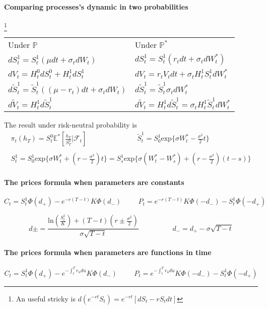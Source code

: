 \documentclass[a4paper,10pt]{article}
\begin{document}
\paragraph{Comparing processes's dynamic in two probabilities} \footnote{An useful stricky is $d(e^{-rt}S_t) = e^{-rt}[dS_t - rS_tdt ]$}
\begin{center}
\begin{tabular}{l|l}
 Under $\mathbb{P}$ & Under $\mathbb{P}^*$                                                      \\[6pt]
 $ dS^1_t = S^1_t( \mu dt + \sigma_t d W_t) $       &  $ dS^1_t = S^1_t( r_t dt + \sigma_t d W^*_t) $ \\[3pt]
 $ dV_t = H^0_t dS^0_t + H^1_t dS^1_t     $         &  $ dV_t = r_t V_t dt + \sigma_t H^1_t S^1_t dW^*_t  $ \\[3pt]
 $ d\widetilde{S}^1_t = \widetilde{S}^1_t( (\mu-r_t)dt + \sigma_t dW_t ) $ & $d\widetilde{S}^1_t = \widetilde{S}^1_t \sigma_t dW^*_t  $ \\[3pt]
 $ d\widetilde{V}_t = H^1_t d\widetilde{S}^1_t $ & $d\widetilde{V}_t = H^1_t d\widetilde{S}^1_t =  \sigma_t H^1_t \widetilde{S}^1_t dW^*_t $
\end{tabular}
\end{center}
The result under risk-neutral probability is
\[
\begin{array}{l}
\pi_t(h_{T}) = S^0_t \mathbb{E}^*[\frac{h_T}{S^0_T} | \mathcal{F}_t]
\hspace{3cm}
\widetilde{S}^1_t = S^1_0\text{exp}\{ \sigma W^*_t -\frac{\sigma^2}{2}t\}  \\ \\
S^1_t = S^1_0\text{exp}\{  \sigma W^*_t + (r-\frac{\sigma^2}{2})t \} = S^1_s\text{exp}\{  \sigma (W^*_t - W^*_s) + (r-\frac{\sigma^2}{2})(t-s) \}
\end{array}
\]

\paragraph{The prices formula when parameters are constants}
\[
C_t = S^1_t \Phi(d_+) - e^{-r(T-t)} K \Phi(d_-)
\hspace{1cm}
P_t = e^{-r(T-t)} K \Phi(-d_-) - S^1_t \Phi(-d_+)
\]

\[
d\pm = \frac{ \text{ln}(\frac{S^1_t}{K}) + (T-t)( r\pm \frac{\sigma^2}{2})  }{\sigma \sqrt{T-t}} 
\hspace{2cm}
d_- = d_+  - \sigma \sqrt{T-t}
\]
\paragraph{The prices formula when parameters are functions in time}
\[
C_t = S^1_t \Phi(d_+) - e^{- \int^T_t r_udu } K \Phi(d_-)
\hspace{1cm}
P_t = e^{- \int^T_t r_udu } K \Phi(-d_-) - S^1_t \Phi(-d_+)
\]
\end{document}
